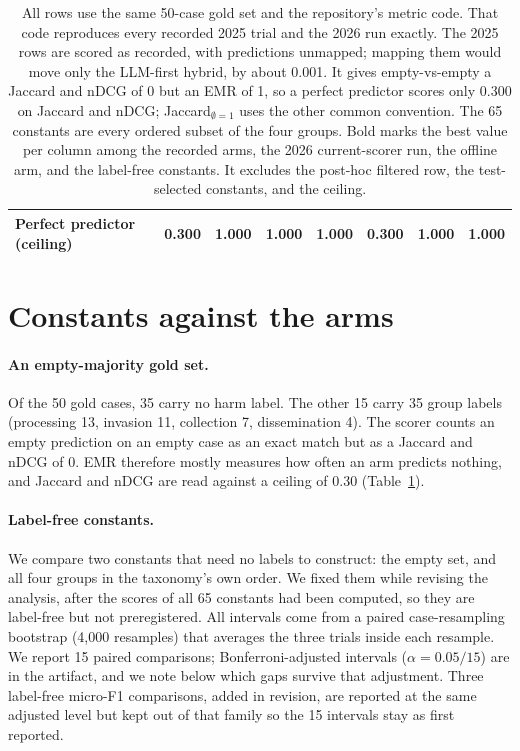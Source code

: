 \documentclass[10pt,twocolumn]{article}
\begin{document}
\begin{table}[t]
\begin{tabular}{@{}lccccccc@{}}
\midrule
Perfect predictor (ceiling)          & 0.300 & 1.000 & 1.000 & 1.000 & 0.300 & 1.000 & 1.000 \\
\bottomrule
\end{tabular}
\caption{All rows use the same 50-case gold set and the repository's metric
code. That code reproduces every recorded 2025 trial and the 2026 run exactly.
The 2025 rows are scored as recorded, with predictions unmapped; mapping them
would move only the LLM-first hybrid, by about 0.001.
It gives empty-vs-empty a Jaccard and nDCG of 0 but an EMR of 1, so a perfect
predictor scores only 0.300 on Jaccard and nDCG; Jaccard$_{\emptyset=1}$ uses
the other common convention. The 65 constants are every ordered subset of the
four groups. Bold marks the best value per column among the recorded arms, the
2026 current-scorer run, the offline arm, and the label-free constants. It
excludes the post-hoc filtered row, the test-selected constants, and the
ceiling.}
\label{tab:main}
\end{table}

\section{Constants against the arms}
\label{sec:baselines}

\paragraph{An empty-majority gold set.} Of the 50 gold cases, 35 carry no harm
label. The other 15 carry 35 group labels (processing 13, invasion 11,
collection 7, dissemination 4). The scorer counts an empty prediction on an
empty case as an exact match but as a Jaccard and nDCG of 0. EMR therefore
mostly measures how often an arm predicts nothing, and Jaccard and nDCG are
read against a ceiling of 0.30 (Table~\ref{tab:main}).

\paragraph{Label-free constants.} We compare two constants that need no labels
to construct: the empty set, and all four groups in the taxonomy's own order.
We fixed them while revising the analysis, after the scores of all 65
constants had been computed, so they are label-free but not preregistered. All
intervals come from a paired case-resampling bootstrap (4{,}000 resamples)
that averages the three trials inside each resample. We report 15 paired
comparisons; Bonferroni-adjusted intervals ($\alpha = 0.05/15$) are in the
artifact, and we note below which gaps survive that adjustment. Three
label-free micro-F1 comparisons, added in revision, are reported at the same
adjusted level but kept out of that family so the 15 intervals stay as
first reported.
\end{document}
